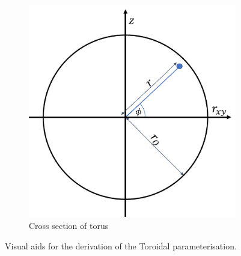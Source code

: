 \documentclass[12pt]{ociamthesis}
\begin{document}
\begin{figure}[H]
\begin{subfigure}{0.5\textwidth}
     \includegraphics[width=\textwidth]{Pics/TorusCordsr_XYZ.png}
     \caption{Cross section of torus}
     \label{Torus_z}
 \end{subfigure}
 \caption{Visual aids for the derivation of the Toroidal parameterisation.} \label{BO}
\end{figure}
\end{document}
